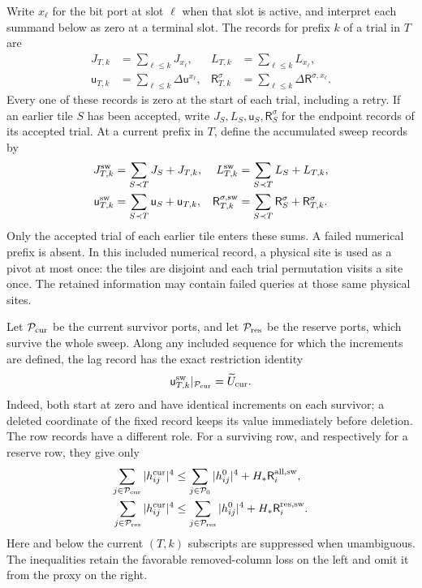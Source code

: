 Write \(x_\ell\) for the bit port at slot \(\ell\) when that slot is active, and
interpret each summand below as zero at a terminal slot.  The records
for prefix \(k\) of a trial in \(T\) are
\[
 \begin{aligned}
 J_{T,k}&=\sum_{\ell\le k}J_{x_\ell},&
 L_{T,k}&=\sum_{\ell\le k}L_{x_\ell},\\
 \mathsf u_{T,k}&=\sum_{\ell\le k}\Delta\mathsf u^{x_\ell},&
 \mathsf R^\sigma_{T,k}&=\sum_{\ell\le k}\Delta\mathsf R^{\sigma,x_\ell}.
 \end{aligned}
\]
Every one of these records is zero at the start of each trial, including
a retry.  If an earlier tile \(S\) has been accepted, write
\(J_S,L_S,\mathsf u_S,\mathsf R^\sigma_S\) for the endpoint records of its
accepted trial.  At a current prefix in \(T\), define the accumulated
sweep records by
\begin{equation}\label{eq:local-sweep-records}
 \begin{aligned}
 J^{\rm sw}_{T,k}&=\sum_{S\prec T}J_S+J_{T,k},&
 L^{\rm sw}_{T,k}&=\sum_{S\prec T}L_S+L_{T,k},\\
 \mathsf u^{\rm sw}_{T,k}&=\sum_{S\prec T}\mathsf u_S+\mathsf u_{T,k},&
 \mathsf R^{\sigma,\rm sw}_{T,k}
   &=\sum_{S\prec T}\mathsf R^\sigma_S+\mathsf R^\sigma_{T,k}.
 \end{aligned}
\end{equation}
Only the accepted trial of each earlier tile enters these sums.  A
failed numerical prefix is absent.  In this included numerical record,
a physical site is used as a pivot at most once: the tiles are disjoint
and each trial permutation visits a site once.  The retained information
may contain failed queries at those same physical sites.

Let \(\mathcal P_{\rm cur}\) be the current survivor ports, and let
\(\mathcal P_{\rm res}\) be the reserve ports, which survive the whole
sweep.  Along any included sequence for which the increments are defined,
the lag record has the exact restriction identity
\[
 \mathsf u^{\rm sw}_{T,k}|_{\mathcal P_{\rm cur}}
       =\widetilde U_{\rm cur}.
\]
Indeed, both start at zero and have identical increments on each
survivor; a deleted coordinate of the fixed record keeps its value
immediately before deletion.  The row records have a different role.
For a surviving row, and respectively for a reserve row, they give only
\begin{align*}
 \sum_{j\in\mathcal P_{\rm cur}}|h^{\rm cur}_{ij}|^4
 &\le \sum_{j\in\mathcal P_0}|h^0_{ij}|^4
             +H_*\mathsf R_i^{\mathrm{all},\rm sw},\\
 \sum_{j\in\mathcal P_{\rm res}}|h^{\rm cur}_{ij}|^4
 &\le \sum_{j\in\mathcal P_{\rm res}}|h^0_{ij}|^4
             +H_*\mathsf R_i^{\mathrm{res},\rm sw}.
\end{align*}
Here and below the current \((T,k)\) subscripts are suppressed when
unambiguous.  The inequalities retain the favorable removed-column
loss on the left and omit it from the proxy on the right.

